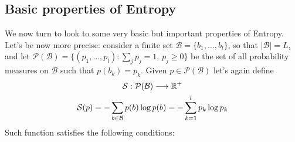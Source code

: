 \subsection{Basic properties of Entropy}
We now turn to look to some very basic but important properties of Entropy.
\\Let's be now more precise: consider a finite set $\mathcal{B} = \{ b_1, \dots, b_l \}$, so that $|\mathcal{B}| = L$, and let $\mathcal{P(\mathcal{B})} = \{ (p_1, \dots, p_l) : \sum_j p_j = 1, \, p_j \geq 0 \}$ be the set of all probability measures on $\mathcal{B}$ such that $p(b_k) = p_k$. Given $p \in \mathcal{P(\mathcal{B})} $ let's again define 
\begin{gather}
    \mathcal{S}: \mathcal{P(\mathcal{B})} \longrightarrow \mathbb{R}^+ \nonumber \\
    \mathcal{S}(p) = - \sum_{b \in \mathcal{B}} p(b) \log p(b) = - \sum_{k=1}^l p_k \log p_k
\end{gather}
Such function satisfies the following conditions:
